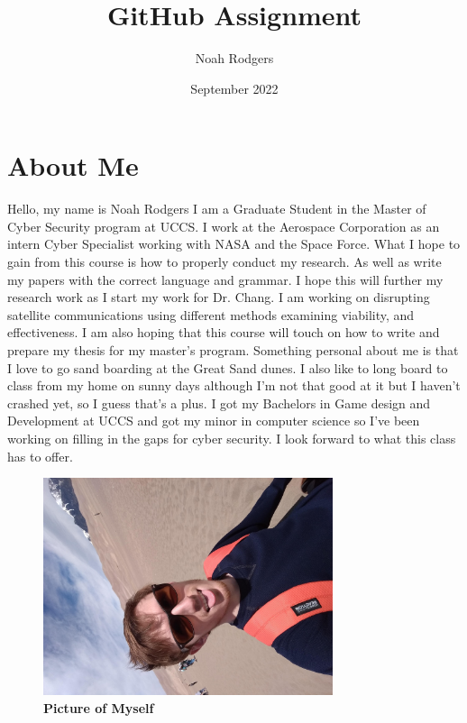 
\title{GitHub Assignment}
\author{Noah Rodgers}
\date{September 2022}

%

\maketitle

\section{About Me}

Hello, my name is Noah Rodgers I am a Graduate Student in the Master of Cyber Security program at UCCS. I work at the Aerospace Corporation as an intern Cyber Specialist working with NASA and the Space Force. What I hope to gain from this course is how to properly conduct my research. As well as write my papers with the correct language and grammar. I hope this will further my research work as I start my work for Dr. Chang. I am working on disrupting satellite communications using different methods examining viability, and effectiveness. I am also hoping that this course will touch on how to write and prepare my thesis for my master’s program. Something personal about me is that I love to go sand boarding at the Great Sand dunes. I also like to long board to class from my home on sunny days although I’m not that good at it but I haven’t crashed yet, so I guess that’s a plus. I got my Bachelors in Game design and Development at UCCS and got my minor in computer science so I’ve been working on filling in the gaps for cyber security. I look forward to what this class has to offer.



\begin{figure}[!htb]
    \centering
    \includegraphics[width=85mm, angle=90]{Me1.jpg}
    \caption{\textbf{Picture of Myself}}
    \label{fig:jamequation}
\end{figure}


